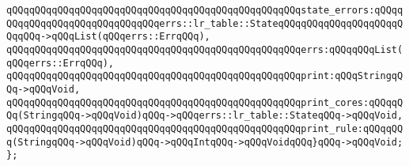 \verb|qQQqqQQqqQQqqQQqqQQqqQQqqQQqqQQqqQQqqQQqqQQqqQQqqQQqstate_errors:qQQqqQQqqQQqqQQqqQQqqQQqqQQqqQQqerrs::lr_table::StateqQQqqQQqqQQqqQQqqQQqqQQqqQQq->qQQqList(qQQqerrs::ErrqQQq),|\newline
\verb|qQQqqQQqqQQqqQQqqQQqqQQqqQQqqQQqqQQqqQQqqQQqqQQqqQQqerrs:qQQqqQQqList(qQQqerrs::ErrqQQq),|\newline
\verb|qQQqqQQqqQQqqQQqqQQqqQQqqQQqqQQqqQQqqQQqqQQqqQQqqQQqprint:qQQqStringqQQq->qQQqVoid,|\newline
\verb|qQQqqQQqqQQqqQQqqQQqqQQqqQQqqQQqqQQqqQQqqQQqqQQqqQQqprint_cores:qQQqqQQq(StringqQQq->qQQqVoid)qQQq->qQQqerrs::lr_table::StateqQQq->qQQqVoid,|\newline
\verb|qQQqqQQqqQQqqQQqqQQqqQQqqQQqqQQqqQQqqQQqqQQqqQQqqQQqprint_rule:qQQqqQQq(StringqQQq->qQQqVoid)qQQq->qQQqIntqQQq->qQQqVoidqQQq}qQQq->qQQqVoid;|\newline
\verb|};|\newline
\newline

